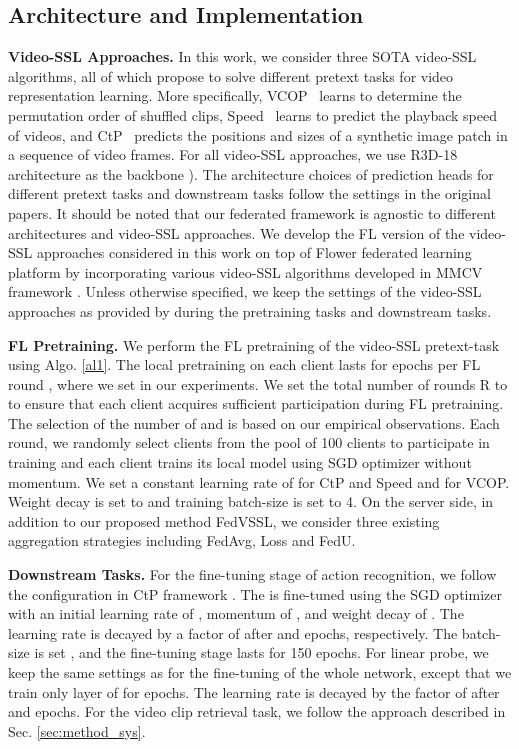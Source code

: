\subsection{Architecture and Implementation}
\label{section:Archiecture and Implementation}
\textbf{Video-SSL Approaches.} In this work, we consider three SOTA video-SSL algorithms, all of which propose to solve different pretext tasks for video representation learning. More specifically, VCOP~\cite{xu2019self} learns to determine the permutation order of shuffled clips, Speed~\cite{benaim2020speednet,yao2020video,cho2021self} learns to predict the playback speed of videos, and CtP~\cite{wang2021unsupervised} predicts the positions and sizes of a synthetic image patch in a sequence of video frames. 
For all video-SSL approaches, we use R3D-18 \cite{tran2018closer} architecture as the backbone ). The architecture choices of prediction heads for different pretext tasks and downstream tasks follow the settings in the original papers. It should be noted that our federated framework is agnostic to different architectures and video-SSL approaches. We develop the FL version of the video-SSL approaches considered in this work on top of Flower \cite{beutel2020flower} federated learning platform by incorporating various video-SSL algorithms developed in MMCV framework \cite{mmcv,wang2021unsupervised}.     
Unless otherwise specified, we keep the settings of the video-SSL approaches as provided by \cite{wang2021unsupervised} during the pretraining tasks and downstream tasks. 


\noindent \textbf{FL Pretraining.} We perform the FL pretraining of the video-SSL pretext-task  using Algo. \ref{al1}. The local pretraining on each client lasts for  epochs per FL round , where we set  in our experiments. 
We set the total number of rounds R to  to ensure that each client acquires sufficient participation during FL pretraining.
The selection of the number of  and  is based on our empirical observations. Each round, we randomly select  clients from the pool of 100 clients to participate in training and each client trains its local model using SGD optimizer without momentum. We set a constant learning rate of  for CtP and Speed and  for VCOP. Weight decay is set to  and training batch-size is set to 4. On the server side, in addition to our proposed method FedVSSL, we consider three existing aggregation strategies including FedAvg, Loss and FedU.
 
\noindent \textbf{Downstream Tasks.} For the fine-tuning stage of action recognition, we follow the configuration in CtP framework \cite{wang2021unsupervised}. The  is fine-tuned using the SGD optimizer with an initial learning rate of , momentum of , and weight decay of . The learning rate is decayed by a factor of  after  and  epochs, respectively. The batch-size is set , and the fine-tuning stage lasts for 150 epochs. For linear probe, we keep the same settings as for the fine-tuning of the whole network, except that we train only  layer of  for  epochs. The learning rate is decayed by the factor of  after  and  epochs. For the video clip retrieval task, we follow the approach described in Sec. \ref{sec:method_sys}.

